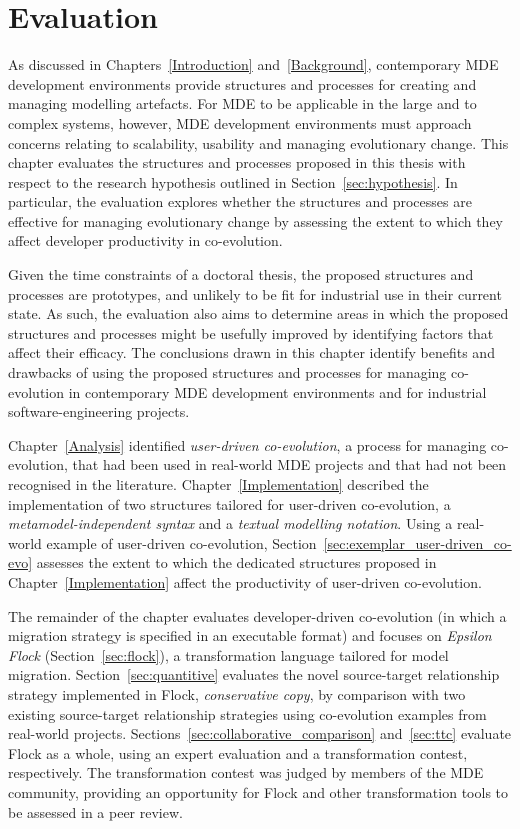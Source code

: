 
\chapter{Evaluation}
\label{Evaluation}
As discussed in Chapters~\ref{Introduction} and~\ref{Background}, contemporary MDE development environments provide structures and processes for creating and managing modelling artefacts. For MDE to be applicable in the large and to complex systems, however, MDE development environments must approach concerns relating to scalability, usability and managing evolutionary change. This chapter evaluates the structures and processes proposed in this thesis with respect to the research hypothesis outlined in Section~\ref{sec:hypothesis}. In particular, the evaluation explores whether the structures and processes are effective for managing evolutionary change by assessing the extent to which they affect developer productivity in co-evolution.

Given the time constraints of a doctoral thesis, the proposed structures and processes are prototypes, and unlikely to be fit for industrial use in their current state. As such, the evaluation also aims to determine areas in which the proposed structures and processes might be usefully improved by identifying factors that affect their efficacy. The conclusions drawn in this chapter identify benefits and drawbacks of using the proposed structures and processes for managing co-evolution in contemporary MDE development environments and for industrial software-engineering projects.

Chapter~\ref{Analysis} identified \emph{user-driven co-evolution}, a process for managing co-evolution, that had been used in real-world MDE projects and that had not been recognised in the literature. Chapter~\ref{Implementation} described the implementation of two structures tailored for user-driven co-evolution, a \emph{metamodel-independent syntax} and a \emph{textual modelling notation}. Using a real-world example of user-driven co-evolution, Section~\ref{sec:exemplar_user-driven_co-evo} assesses the extent to which the dedicated structures proposed in Chapter~\ref{Implementation} affect the productivity of user-driven co-evolution.

The remainder of the chapter evaluates developer-driven co-evolution (in which a migration strategy is specified in an executable format) and focuses on \emph{Epsilon Flock} (Section~\ref{sec:flock}), a transformation language tailored for model migration. Section~\ref{sec:quantitive} evaluates the novel source-target relationship strategy implemented in Flock, \emph{conservative copy}, by comparison with two existing source-target relationship strategies using co-evolution examples from real-world projects. Sections~\ref{sec:collaborative_comparison} and~\ref{sec:ttc} evaluate Flock as a whole, using an expert evaluation and a transformation contest, respectively. The transformation contest was judged by members of the MDE community, providing an opportunity for Flock and other transformation tools to be assessed in a peer review.

